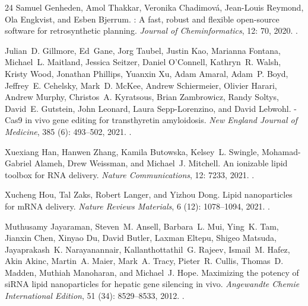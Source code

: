 \documentclass{article}
\begin{document}
\begin{thebibliography}{24}
Samuel Genheden, Amol Thakkar, Veronika Chadimov\'{a}, Jean-Louis Reymond, Ola
  Engkvist, and Esben Bjerrum.
: A fast, robust and flexible open-source software for
  retrosynthetic planning.
\newblock \emph{Journal of Cheminformatics}, 12: 70, 2020.
\newblock {}.

Julian~D. Gillmore, Ed~Gane, Jorg Taubel, Justin Kao, Marianna Fontana,
  Michael~L. Maitland, Jessica Seitzer, Daniel O'Connell, Kathryn~R. Walsh,
  Kristy Wood, Jonathan Phillips, Yuanxin Xu, Adam Amaral, Adam~P. Boyd,
  Jeffrey~E. Cehelsky, Mark~D. McKee, Andrew Schiermeier, Olivier Harari,
  Andrew Murphy, Christos~A. Kyratsous, Brian Zambrowicz, Randy Soltys,
  David~E. Gutstein, John Leonard, Laura Sepp-Lorenzino, and David Lebwohl.
-{Cas9} in vivo gene editing for transthyretin amyloidosis.
\newblock \emph{New England Journal of Medicine}, 385 (6):
  493--502, 2021.
\newblock {}.

Xuexiang Han, Hanwen Zhang, Kamila Butowska, Kelsey~L. Swingle, Mohamad-Gabriel
  Alameh, Drew Weissman, and Michael~J. Mitchell.
\newblock An ionizable lipid toolbox for {RNA} delivery.
\newblock \emph{Nature Communications}, 12: 7233, 2021.
\newblock {}.

Xucheng Hou, Tal Zaks, Robert Langer, and Yizhou Dong.
\newblock Lipid nanoparticles for {mRNA} delivery.
\newblock \emph{Nature Reviews Materials}, 6 (12):
  1078--1094, 2021.
\newblock {}.

Muthusamy Jayaraman, Steven~M. Ansell, Barbara~L. Mui, Ying~K. Tam, Jianxin
  Chen, Xinyao Du, David Butler, Laxman Eltepu, Shigeo Matsuda, Jayaprakash~K.
  Narayanannair, Kallanthottathil~G. Rajeev, Ismail~M. Hafez, Akin Akinc,
  Martin~A. Maier, Mark~A. Tracy, Pieter~R. Cullis, Thomas~D. Madden, Muthiah
  Manoharan, and Michael~J. Hope.
\newblock Maximizing the potency of {siRNA} lipid nanoparticles for hepatic
  gene silencing in vivo.
\newblock \emph{Angewandte Chemie International Edition}, 51
  (34): 8529--8533, 2012.
\newblock {}.


\end{thebibliography}
\end{document}
